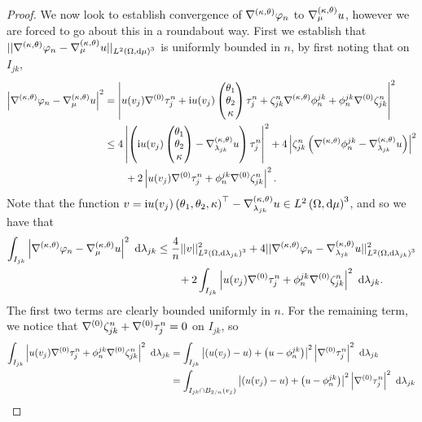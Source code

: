 \begin{proof}
	We now look to establish convergence of $\nabla^{\left( \kappa, \theta \right)}\varphi_n$ to $\nabla^{\left( \kappa, \theta \right)}_{\mu}u$, however we are forced to go about this in a roundabout way.
	First we establish that $\lvert\lvert \nabla^{\left( \kappa, \theta \right)}\varphi_n-\nabla^{\left( \kappa, \theta \right)}_{\mu}u \rvert\rvert_{L^{2}\left( \Omega,\mathrm{d} \mu \right)^3}$ is uniformly bounded in $n$, by first noting that on $I_{jk}$,
	\begin{align*}
		\left\lvert \nabla^{\left( \kappa, \theta \right)}\varphi_n - \nabla^{\left( \kappa, \theta \right)}_{\mu}u \right\rvert^2
		&= \left\lvert u(v_j)\nabla^{(0)}\tau_j^n + \mathrm{i} u(v_j)\begin{pmatrix} \theta_1 \\ \theta_2 \\ \kappa \end{pmatrix} \tau_j^n + \zeta_{jk}^n\nabla^{\left( \kappa, \theta \right)}\phi_n^{jk} + \phi_n^{jk}\nabla^{(0)}\zeta_{jk}^n \right\rvert^2 \\
		&\leq 4\left\lvert \left( \mathrm{i} u(v_j)\begin{pmatrix} \theta_1 \\ \theta_2 \\ \kappa \end{pmatrix}-\nabla^{\left( \kappa, \theta \right)}_{\lambda_{jk}}u \right)\tau_j^n \right\rvert^2 + 4\left\lvert \zeta_{jk}^n\left( \nabla^{\left( \kappa, \theta \right)}\phi_n^{jk}-\nabla^{\left( \kappa, \theta \right)}_{\lambda_{jk}}u \right) \right\rvert^2 \\
		&\qquad + 2\left\lvert u(v_j)\nabla^{(0)}\tau_j^n + \phi_n^{jk}\nabla^{(0)}\zeta_{jk}^n \right\rvert^2.
	\end{align*}
	Note that the function $v = \mathrm{i} u(v_j)\left( \theta_1,\theta_2,\kappa \right)^\top - \nabla^{\left( \kappa, \theta \right)}_{\lambda_{jk}}u\in L^{2}\left( \Omega,\mathrm{d} \mu \right)^3$, and so we have that
	\begin{align*}
		\int_{I_{jk}} \left\lvert \nabla^{\left( \kappa, \theta \right)}\varphi_n - \nabla^{\left( \kappa, \theta \right)}_{\mu}u \right\rvert^2  \ \mathrm{d}\lambda_{jk}
		&\leq \frac{4}{n}\lvert\lvert v \rvert\rvert_{L^{2}\left( \Omega,\mathrm{d} \lambda_{jk} \right)^3}^2 + 4\lvert\lvert \nabla^{\left( \kappa, \theta \right)}\varphi_n 
		- \nabla^{\left( \kappa, \theta \right)}_{\lambda_{jk}}u \rvert\rvert_{L^{2}\left( \Omega,\mathrm{d} \lambda_{jk} \right)^3}^2 \\
		&\qquad + 2\int_{I_{jk}} \left\lvert u(v_j)\nabla^{(0)}\tau_j^n + \phi_n^{jk}\nabla^{(0)}\zeta_{jk}^n \right\rvert^2  \ \mathrm{d}\lambda_{jk}.
	\end{align*}
	The first two terms are clearly bounded uniformly in $n$.
	For the remaining term, we notice that $\nabla^{(0)}\zeta_{jk}^n+\nabla^{(0)}\tau_j^n=0$ on $I_{jk}$, so 
	\begin{align*}
		\integral{I_{jk}}{ \abs{u(v_j)\ograd\tau_j^n + \phi_n^{jk}\ograd\zeta_{jk}^n}^2 }{\lambda_{jk}}
		&= \integral{I_{jk}}{ \abs{ \bracs{u(v_j)-u} + \bracs{u - \phi_n^{jk}} }^2\abs{ \ograd\tau_j^n }^2 }{\lambda_{jk}} \\
		&= \integral{I_{jk}\cap B_{2/n}(v_j)}{ \abs{ \bracs{u(v_j)-u} + \bracs{u - \phi_n^{jk}} }^2\abs{ \ograd\tau_j^n }^2 }{\lambda_{jk}} \\

\end{align*}
\end{proof}
